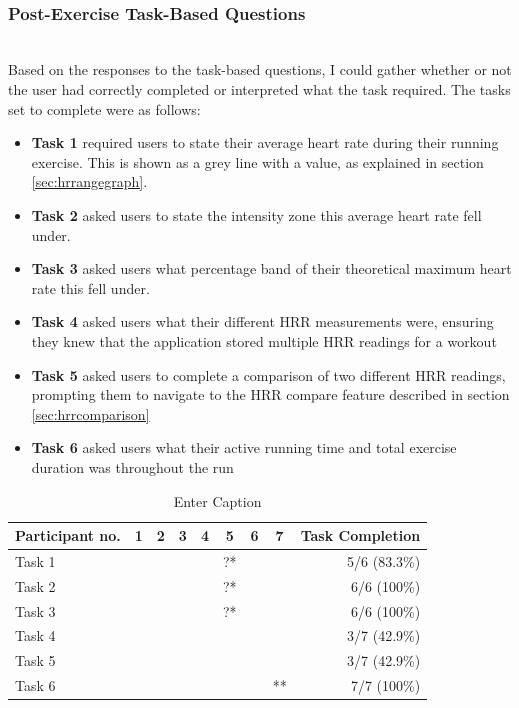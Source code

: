 \documentclass{l4proj}
\newcommand{\cmark}{\ding{51}}
\newcommand{\xmark}{\ding{55}}
\begin{document}
\noindent\mbox{}\\
\subsubsection{Post-Exercise Task-Based Questions}
\noindent\mbox{}\\

Based on the responses to the task-based questions, I could gather whether or not the user had correctly completed or interpreted what the task required. The tasks set to complete were as follows:

\begin{itemize}
    \item \textbf{Task 1} required users to state their average heart rate during their running exercise. This is shown as a grey line with a value, as explained in section \ref{sec:hrrangegraph}.
    \item \textbf{Task 2} asked users to state the intensity zone this average heart rate fell under.
    \item \textbf{Task 3} asked users what percentage band of their theoretical maximum heart rate this fell under.
    \item \textbf{Task 4} asked users what their different HRR measurements were, ensuring they knew that the application stored multiple HRR readings for a workout
    \item \textbf{Task 5} asked users to complete a comparison of two different HRR readings, prompting them to navigate to the HRR compare feature described in section \ref{sec:hrrcomparison}
    \item \textbf{Task 6} asked users what their active running time and total exercise duration was throughout the run
\end{itemize}

\begin{table}[h!]
    \centering
    \caption{Enter Caption} %
    \label{fig:enter-label}
    \begin{tabular}{|l|ccccccc|r|}
        \hline  
        Participant no. & 1 & 2 & 3 & 4 & 5 & 6 & 7 & Task Completion \\
        \hline
        Task 1 & \cmark & \cmark & \cmark & \xmark & ?* & \cmark & \cmark & 5/6 (83.3\%)\\
        Task 2 & \cmark & \cmark & \cmark & \cmark & ?* & \cmark & \cmark & 6/6 (100\%)\\
        Task 3 & \cmark & \cmark & \cmark & \cmark & ?* & \cmark & \xmark & 6/6 (100\%)\\
        Task 4 & \xmark & \cmark & \xmark & \xmark & \cmark & \cmark & \xmark & 3/7 (42.9\%)\\
        Task 5 & \xmark & \cmark & \xmark & \xmark & \cmark & \cmark & \xmark & 3/7 (42.9\%)\\
        Task 6 & \cmark & \cmark & \cmark & \cmark & \cmark & \cmark & \cmark** & 7/7 (100\%)\\
        \hline
    \end{tabular}
\end{table}
\end{document}
